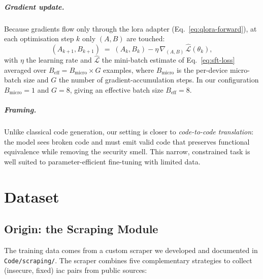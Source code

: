 \documentclass[12pt, a4paper]{report}
\begin{document}
\paragraph{Gradient update.} Because gradients flow only through the
\gls{lora} adapter (Eq.~\eqref{eq:qlora-forward}), at each optimisation
step \(k\) only \((A, B)\) are touched:
\begin{equation}
  (A_{k+1}, B_{k+1})
    \;=\; (A_{k}, B_{k})
        - \eta\,\nabla_{(A,B)}\,
          \widehat{\mathcal{L}}(\theta_{k}),
  \label{eq:sft-step}
\end{equation}
with \(\eta\) the learning rate and
\(\widehat{\mathcal{L}}\) the mini-batch estimate of
Eq.~\eqref{eq:sft-loss} averaged over
\(B_{\mathrm{eff}} = B_{\mathrm{micro}} \times G\) examples, where
\(B_{\mathrm{micro}}\) is the per-device micro-batch size and
\(G\) the number of gradient-accumulation steps. In our configuration
\(B_{\mathrm{micro}} = 1\) and \(G = 8\), giving an effective batch
size \(B_{\mathrm{eff}} = 8\).

\paragraph{Framing.} Unlike classical code generation, our setting is
closer to \emph{code-to-code translation}: the model sees broken code
and must emit valid code that preserves functional equivalence while
removing the security smell. This narrow, constrained task is well
suited to parameter-efficient fine-tuning with limited data.

\chapter{Dataset}
\label{ch:dataset}

\section{Origin: the Scraping Module}

The training data comes from a custom scraper we developed and documented
in \texttt{Code/scraping/}. The scraper combines five complementary
strategies to collect (insecure, fixed) \gls{iac} pairs from public sources:
\end{document}
